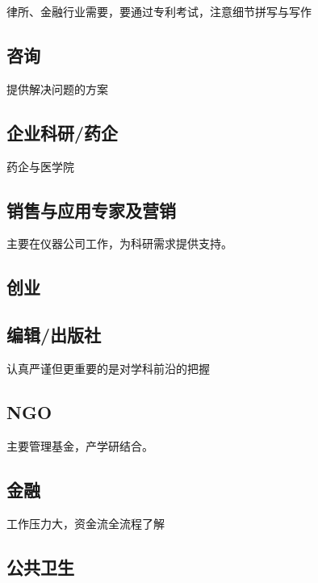 \documentclass[]{tufte-book}
\begin{document}
律所、金融行业需要，要通过专利考试，注意细节拼写与写作

\hypertarget{ux54a8ux8be2}{%
\subsection{咨询}\label{ux54a8ux8be2}}

提供解决问题的方案

\hypertarget{ux4f01ux4e1aux79d1ux7814ux836fux4f01}{%
\subsection{企业科研/药企}\label{ux4f01ux4e1aux79d1ux7814ux836fux4f01}}

药企与医学院

\hypertarget{ux9500ux552eux4e0eux5e94ux7528ux4e13ux5bb6ux53caux8425ux9500}{%
\subsection{销售与应用专家及营销}\label{ux9500ux552eux4e0eux5e94ux7528ux4e13ux5bb6ux53caux8425ux9500}}

主要在仪器公司工作，为科研需求提供支持。

\hypertarget{ux521bux4e1a}{%
\subsection{创业}\label{ux521bux4e1a}}

\hypertarget{ux7f16ux8f91ux51faux7248ux793e}{%
\subsection{编辑/出版社}\label{ux7f16ux8f91ux51faux7248ux793e}}

认真严谨但更重要的是对学科前沿的把握

\hypertarget{ngo}{%
\subsection{NGO}\label{ngo}}

主要管理基金，产学研结合。

\hypertarget{ux91d1ux878d}{%
\subsection{金融}\label{ux91d1ux878d}}

工作压力大，资金流全流程了解

\hypertarget{ux516cux5171ux536bux751f}{%
\subsection{公共卫生}\label{ux516cux5171ux536bux751f}}
\end{document}
